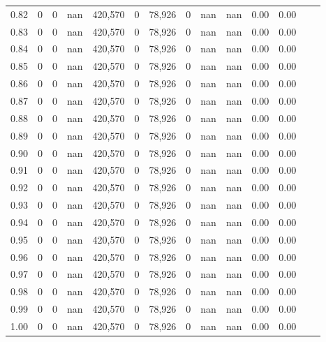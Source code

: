 \begin{tabular}{rrrrrrrrrrrrrr}
0.82 &        0 &       0 &     nan &  420,570 &        0 &  78,926 &       0 &   nan &   nan &  0.00 &      0.00 \\
0.83 &        0 &       0 &     nan &  420,570 &        0 &  78,926 &       0 &   nan &   nan &  0.00 &      0.00 \\
0.84 &        0 &       0 &     nan &  420,570 &        0 &  78,926 &       0 &   nan &   nan &  0.00 &      0.00 \\
0.85 &        0 &       0 &     nan &  420,570 &        0 &  78,926 &       0 &   nan &   nan &  0.00 &      0.00 \\
0.86 &        0 &       0 &     nan &  420,570 &        0 &  78,926 &       0 &   nan &   nan &  0.00 &      0.00 \\
0.87 &        0 &       0 &     nan &  420,570 &        0 &  78,926 &       0 &   nan &   nan &  0.00 &      0.00 \\
0.88 &        0 &       0 &     nan &  420,570 &        0 &  78,926 &       0 &   nan &   nan &  0.00 &      0.00 \\
0.89 &        0 &       0 &     nan &  420,570 &        0 &  78,926 &       0 &   nan &   nan &  0.00 &      0.00 \\
0.90 &        0 &       0 &     nan &  420,570 &        0 &  78,926 &       0 &   nan &   nan &  0.00 &      0.00 \\
0.91 &        0 &       0 &     nan &  420,570 &        0 &  78,926 &       0 &   nan &   nan &  0.00 &      0.00 \\
0.92 &        0 &       0 &     nan &  420,570 &        0 &  78,926 &       0 &   nan &   nan &  0.00 &      0.00 \\
0.93 &        0 &       0 &     nan &  420,570 &        0 &  78,926 &       0 &   nan &   nan &  0.00 &      0.00 \\
0.94 &        0 &       0 &     nan &  420,570 &        0 &  78,926 &       0 &   nan &   nan &  0.00 &      0.00 \\
0.95 &        0 &       0 &     nan &  420,570 &        0 &  78,926 &       0 &   nan &   nan &  0.00 &      0.00 \\
0.96 &        0 &       0 &     nan &  420,570 &        0 &  78,926 &       0 &   nan &   nan &  0.00 &      0.00 \\
0.97 &        0 &       0 &     nan &  420,570 &        0 &  78,926 &       0 &   nan &   nan &  0.00 &      0.00 \\
0.98 &        0 &       0 &     nan &  420,570 &        0 &  78,926 &       0 &   nan &   nan &  0.00 &      0.00 \\
0.99 &        0 &       0 &     nan &  420,570 &        0 &  78,926 &       0 &   nan &   nan &  0.00 &      0.00 \\
1.00 &        0 &       0 &     nan &  420,570 &        0 &  78,926 &       0 &   nan &   nan &  0.00 &      0.00 \\
\bottomrule
\end{tabular}

